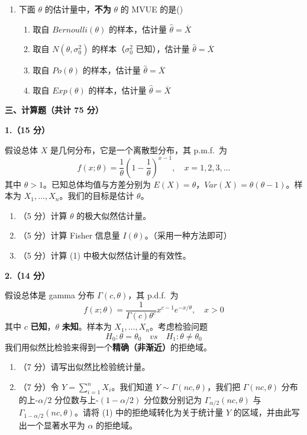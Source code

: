 \documentclass[12pt,a4paper]{ctexart}
\newcommand{\question}[1]{\bigskip\noindent\textbf{#1}\par\nobreak\medskip}
\begin{document}
\begin{enumerate}[label=\arabic*.,leftmargin=2.2em]
  \item 下面 $\theta$ 的估计量中，\textbf{不为} $\theta$ 的 MVUE 的是\hfill(\underline{\hspace{1.2cm}})
  \begin{enumerate}[label=\Alph*.,leftmargin=2.0em]
    \item 取自 $Bernoulli(\theta)$ 的样本，估计量 $\widehat{\theta}=\overline{X}$
    \item 取自 $N(\theta,\sigma_{0}^{2})$ 的样本（$\sigma_{0}^{2}$ 已知），估计量 $\widehat{\theta}=\overline{X}$
    \item 取自 $Po(\theta)$ 的样本，估计量 $\widehat{\theta}=\overline{X}$
    \item 取自 $Exp(\theta)$ 的样本，估计量 $\widehat{\theta}=\overline{X}$
  \end{enumerate}
\end{enumerate}

\bigskip
\begin{center}\textbf{三、计算题（共计 75 分）}\end{center}

\question{1.（15 分）}
假设总体 $X$ 是几何分布，它是一个离散型分布，其 p.m.f.\ 为
\[ f(x;\theta)=\frac{1}{\theta}\left(1-\frac{1}{\theta}\right)^{x-1},\quad x=1,2,3,\ldots \]
其中 $\theta>1$。已知总体均值与方差分别为 $E(X)=\theta$，$Var(X)=\theta(\theta-1)$。样本为 $X_{1},\ldots,X_{n}$。我们的目标是估计 $\theta$。
\begin{enumerate}[label=(\arabic*),leftmargin=2.4em]
  \item （5 分）计算 $\theta$ 的极大似然估计量。
  \item （5 分）计算 Fisher 信息量 $I(\theta)$。（采用一种方法即可）
  \item （5 分）计算 (1) 中极大似然估计量的有效性。
\end{enumerate}

\question{2.（14 分）}
假设总体是 gamma 分布 $\Gamma(c,\theta)$，其 p.d.f.\ 为
\[ f(x;\theta)=\frac{1}{\Gamma(c)\theta^{c}}x^{c-1}e^{-x/\theta},\quad x>0 \]
其中 $c$ \textbf{已知}，$\theta$ \textbf{未知}。样本为 $X_{1},\ldots,X_{n}$。考虑检验问题
\[ H_{0}:\theta=\theta_{0}\quad vs\quad H_{1}:\theta\neq\theta_{0} \]
我们用似然比检验来得到一个\textbf{精确（非渐近）}的拒绝域。
\begin{enumerate}[label=(\arabic*),leftmargin=2.4em]
  \item （7 分）请写出似然比检验统计量。
  \item （7 分）令 $Y=\sum_{i=1}^{n}X_{i}$。我们知道 $Y\sim\Gamma(nc,\theta)$，我们把 $\Gamma(nc,\theta)$ 分布的上-$\alpha/2$ 分位数与上-$(1-\alpha/2)$ 分位数分别记为 $\Gamma_{\alpha/2}(nc,\theta)$ 与 $\Gamma_{1-\alpha/2}(nc,\theta)$。请将 (1) 中的拒绝域转化为关于统计量 $Y$ 的区域，并由此写出一个显著水平为 $\alpha$ 的拒绝域。
\end{enumerate}
\end{document}
